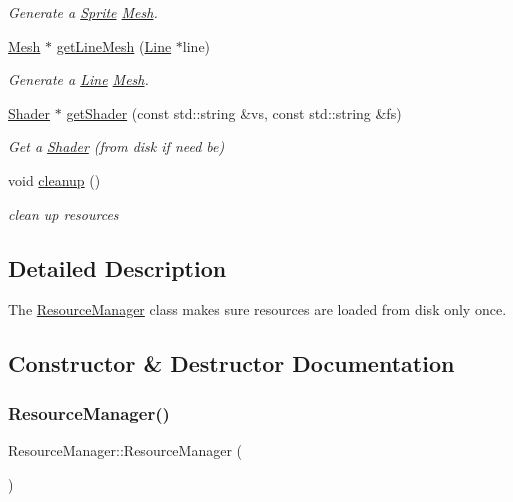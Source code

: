 \begin{DoxyCompactItemize}
\begin{DoxyCompactList}\small\item\em Generate a \hyperlink{class_sprite}{Sprite} \hyperlink{class_mesh}{Mesh}. \end{DoxyCompactList}\item 
\hyperlink{class_mesh}{Mesh} $\ast$ \hyperlink{class_resource_manager_ac6b7bc445bf9193e5791d80d74b07591}{get\+Line\+Mesh} (\hyperlink{class_line}{Line} $\ast$line)
\begin{DoxyCompactList}\small\item\em Generate a \hyperlink{class_line}{Line} \hyperlink{class_mesh}{Mesh}. \end{DoxyCompactList}\item 
\hyperlink{class_shader}{Shader} $\ast$ \hyperlink{class_resource_manager_ad4fba1143552a85ea52f864a1e445c25}{get\+Shader} (const std\+::string \&vs, const std\+::string \&fs)
\begin{DoxyCompactList}\small\item\em Get a \hyperlink{class_shader}{Shader} (from disk if need be) \end{DoxyCompactList}\item 
void \hyperlink{class_resource_manager_a027b7aa8171349b251ec46e4cc8ead56}{cleanup} ()
\begin{DoxyCompactList}\small\item\em clean up resources \end{DoxyCompactList}\end{DoxyCompactItemize}


\subsection{Detailed Description}
The \hyperlink{class_resource_manager}{Resource\+Manager} class makes sure resources are loaded from disk only once. 

\subsection{Constructor \& Destructor Documentation}
\mbox{\label{class_resource_manager_a3b32babd2e81909bbd90d7f2d566fadb}} 
\subsubsection{\texorpdfstring{Resource\+Manager()}{ResourceManager()}}
{\footnotesize\ttfamily Resource\+Manager\+::\+Resource\+Manager (\begin{DoxyParamCaption}{ }\end{DoxyParamCaption})}



